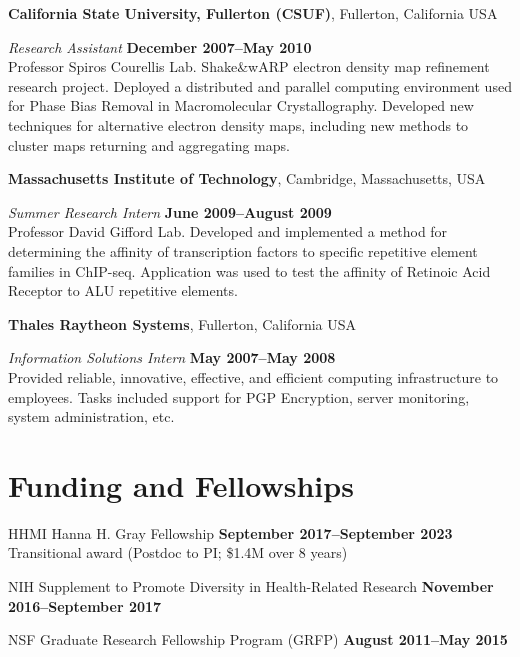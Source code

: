 \documentclass[11pt,notitlepage]{article} %
\begin{document}
{\bf California State University, Fullerton (CSUF)}, Fullerton, California USA

{\em Research Assistant} \hfill {\bf December 2007--May 2010}\\
Professor Spiros Courellis Lab. Shake\&wARP electron density map refinement
research project. Deployed a distributed and parallel computing environment used
for Phase Bias Removal in Macromolecular Crystallography. Developed new
techniques for alternative electron density maps, including new methods to
cluster maps returning and aggregating maps.

\bigskip

{\bf Massachusetts Institute of Technology}, Cambridge, Massachusetts,
USA

{\em Summer Research Intern} \hfill {\bf June 2009--August 2009}\\
Professor David Gifford Lab. Developed and implemented a method for
determining the affinity of transcription factors to specific repetitive element
families in ChIP-seq. Application was used to test the affinity of Retinoic
Acid Receptor to ALU repetitive elements.

\bigskip

{\bf Thales Raytheon Systems}, Fullerton, California USA

{\em Information Solutions Intern} \hfill {\bf May 2007--May 2008}\\
Provided reliable, innovative, effective, and efficient computing infrastructure
to employees. Tasks included support for PGP Encryption, server monitoring,
system administration, etc.



\bigskip
\section*{Funding and Fellowships}
\medskip

HHMI Hanna H. Gray Fellowship \hfill {\bf September 2017--September 2023}\\
Transitional award (Postdoc to PI; \$1.4M over 8 years)

\medskip

NIH Supplement to Promote Diversity in Health-Related Research \hfill {\bf November 2016--September 2017}

\medskip

NSF Graduate Research Fellowship Program (GRFP)
\hfill {\bf August 2011--May 2015}

\medskip
\end{document}
